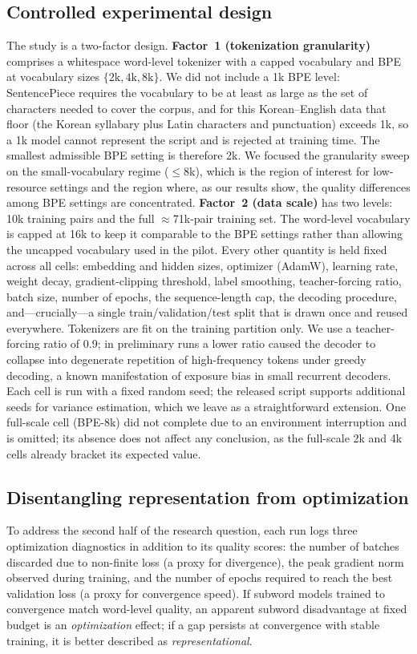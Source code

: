 \documentclass[conference]{IEEEtran}
\begin{document}
\subsection{Controlled experimental design}
The study is a two-factor design.
\textbf{Factor~1 (tokenization granularity)} comprises a whitespace word-level
tokenizer with a capped vocabulary and BPE at vocabulary sizes
$\{2\text{k}, 4\text{k}, 8\text{k}\}$. We did not include a 1k BPE level:
SentencePiece requires the vocabulary to be at least as large as the set of
characters needed to cover the corpus, and for this Korean--English data that
floor (the Korean syllabary plus Latin characters and punctuation) exceeds 1k, so
a 1k model cannot represent the script and is rejected at training time. The
smallest admissible BPE setting is therefore 2k. We focused the granularity sweep
on the small-vocabulary regime ($\le$8k), which is the region of interest for
low-resource settings and the region where, as our results show, the
quality differences among BPE settings are concentrated.
\textbf{Factor~2 (data scale)} has two levels: 10k training pairs and the full
$\approx$71k-pair training set. The word-level vocabulary is capped at 16k to
keep it comparable to the BPE settings rather than allowing the
uncapped vocabulary used in the pilot. Every other quantity is held fixed across
all cells: embedding and hidden sizes, optimizer (AdamW), learning rate, weight
decay, gradient-clipping threshold, label smoothing, teacher-forcing ratio, batch
size, number of epochs, the sequence-length cap, the decoding procedure,
and---crucially---a single train/validation/test split that is drawn once and
reused everywhere. Tokenizers are fit on the training partition only. We use a
teacher-forcing ratio of 0.9; in preliminary runs a lower ratio caused the
decoder to collapse into degenerate repetition of high-frequency tokens under
greedy decoding, a known manifestation of exposure bias in small recurrent
decoders. Each cell is run with a fixed random seed; the released script supports
additional seeds for variance estimation, which we leave as a straightforward
extension. One full-scale cell (BPE-8k) did not complete due to an environment
interruption and is omitted; its absence does not affect any conclusion, as the
full-scale 2k and 4k cells already bracket its expected value.

\subsection{Disentangling representation from optimization}
To address the second half of the research question, each run logs three
optimization diagnostics in addition to its quality scores: the number of
batches discarded due to non-finite loss (a proxy for divergence), the peak
gradient norm observed during training, and the number of epochs required to
reach the best validation loss (a proxy for convergence speed). If subword
models trained to convergence match word-level quality, an apparent subword
disadvantage at fixed budget is an \emph{optimization} effect; if a gap persists
at convergence with stable training, it is better described as
\emph{representational}.
\end{document}
